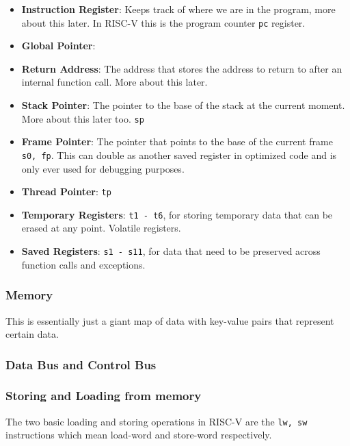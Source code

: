\documentclass{article}
\begin{document}
\begin{itemize}
	\item \textbf{Instruction Register}: Keeps track of where we are in the program, more about this later. In RISC-V this is the program counter \verb|pc| register. %
	\item \textbf{Global Pointer}: %
	\item \textbf{Return Address}: The address that stores the address to return to after an internal function call. More about this later. %
	\item \textbf{Stack Pointer}: The pointer to the base of the stack at the current moment. More about this later too. \verb|sp| %
	\item \textbf{Frame Pointer}: The pointer that points to the base of the current frame \verb|s0, fp|. This can double as another saved register in optimized code and is only ever used for debugging purposes.
	\item \textbf{Thread Pointer}: \verb|tp|%
	\item \textbf{Temporary Registers}: \verb|t1 - t6|, for storing temporary data that can be erased at any point. Volatile registers.
	\item \textbf{Saved Registers}: \verb|s1 - s11|, for data that need to be preserved across function calls and exceptions.
\end{itemize}
\subsubsection{Memory}
This is essentially just a giant map of data with key-value pairs that represent certain data.

\subsubsection{Data Bus and Control Bus}

\subsubsection{Storing and Loading from memory}
The two basic loading and storing operations in RISC-V are the \verb*|lw, sw| instructions which mean load-word and store-word respectively.%
\end{document}
